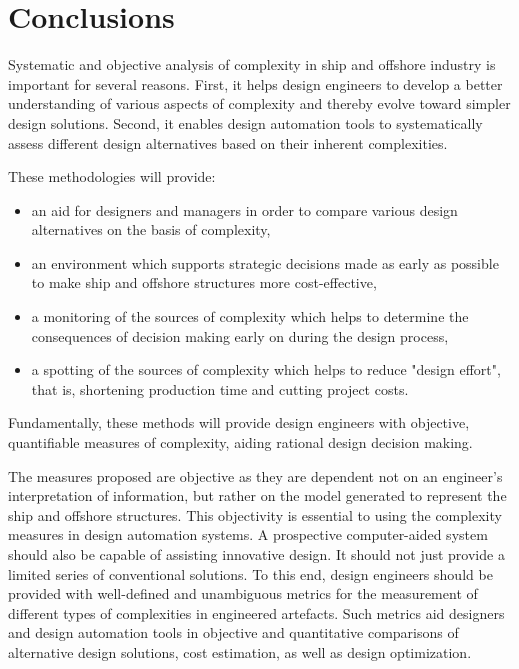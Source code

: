 \section{Conclusions}
Systematic and objective analysis of complexity in ship and offshore industry is important for several reasons. First, it helps design engineers to develop a better understanding of various aspects of complexity and thereby evolve toward simpler design solutions. Second, it enables design automation tools to systematically assess different design alternatives based on their inherent complexities.


These methodologies will provide:
\begin{itemize}
\item an aid for designers and managers in order to compare various design alternatives on the basis of complexity,
\item an environment which supports strategic decisions made as early as possible to make ship and offshore structures more cost-effective,
\item a monitoring of the sources of complexity which helps to determine the consequences of decision making early on during the design process,
\item a spotting of the sources of complexity which helps to reduce "design effort", that is, shortening production time and cutting project costs.
\end{itemize}


Fundamentally, these methods will provide design engineers with objective, quantifiable measures of complexity, aiding rational design decision making.


The measures proposed are objective as they are dependent not on an engineer's interpretation of information, but rather on the model generated to represent the ship and offshore structures. This objectivity is essential to using the complexity measures in design automation systems. A prospective computer-aided system should also be capable of assisting innovative design. It should not just provide a limited series of conventional solutions. To this end, design engineers should be provided with well-defined and unambiguous metrics for the measurement of different types of complexities in engineered artefacts. Such metrics aid designers and design automation tools in objective and quantitative comparisons of alternative design solutions, cost estimation, as well as design optimization.

